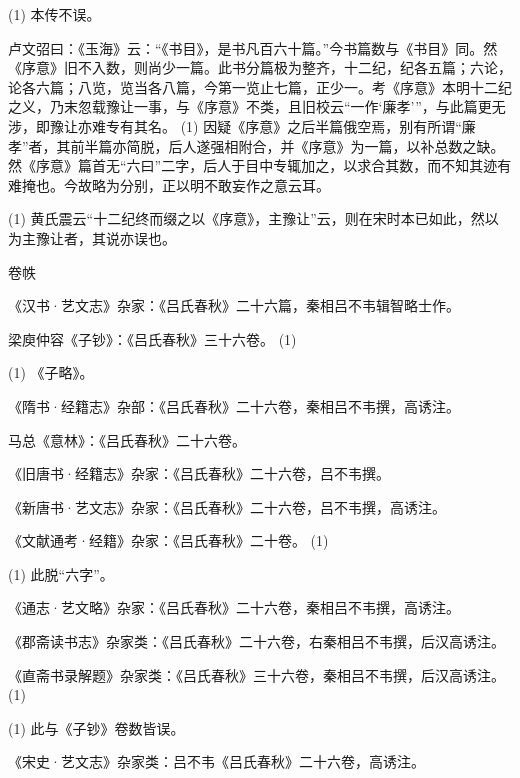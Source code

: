 \documentclass[12pt,UTF8]{ctexbook}
\begin{document}
(1) 本传不误。

卢文弨曰：《玉海》云：“《书目》，是书凡百六十篇。”今书篇数与《书目》同。然《序意》旧不入数，则尚少一篇。此书分篇极为整齐，十二纪，纪各五篇；六论，论各六篇；八览，览当各八篇，今第一览止七篇，正少一。考《序意》本明十二纪之义，乃末忽载豫让一事，与《序意》不类，且旧校云“一作‘廉孝’”，与此篇更无涉，即豫让亦难专有其名。 (1) 因疑《序意》之后半篇俄空焉，别有所谓“廉孝”者，其前半篇亦简脱，后人遂强相附合，并《序意》为一篇，以补总数之缺。然《序意》篇首无“六曰”二字，后人于目中专辄加之，以求合其数，而不知其迹有难掩也。今故略为分别，正以明不敢妄作之意云耳。

(1) 黄氏震云“十二纪终而缀之以《序意》，主豫让”云，则在宋时本已如此，然以为主豫让者，其说亦误也。





卷帙


《汉书·艺文志》杂家：《吕氏春秋》二十六篇，秦相吕不韦辑智略士作。

梁庾仲容《子钞》：《吕氏春秋》三十六卷。 (1)

(1) 《子略》。

《隋书·经籍志》杂部：《吕氏春秋》二十六卷，秦相吕不韦撰，高诱注。

马总《意林》：《吕氏春秋》二十六卷。

《旧唐书·经籍志》杂家：《吕氏春秋》二十六卷，吕不韦撰。

《新唐书·艺文志》杂家：《吕氏春秋》二十六卷，吕不韦撰，高诱注。

《文献通考·经籍》杂家：《吕氏春秋》二十卷。 (1)

(1) 此脱“六字”。

《通志·艺文略》杂家：《吕氏春秋》二十六卷，秦相吕不韦撰，高诱注。

《郡斋读书志》杂家类：《吕氏春秋》二十六卷，右秦相吕不韦撰，后汉高诱注。

《直斋书录解题》杂家类：《吕氏春秋》三十六卷，秦相吕不韦撰，后汉高诱注。 (1)

(1) 此与《子钞》卷数皆误。

《宋史·艺文志》杂家类：吕不韦《吕氏春秋》二十六卷，高诱注。







\backmatter
\end{document}
